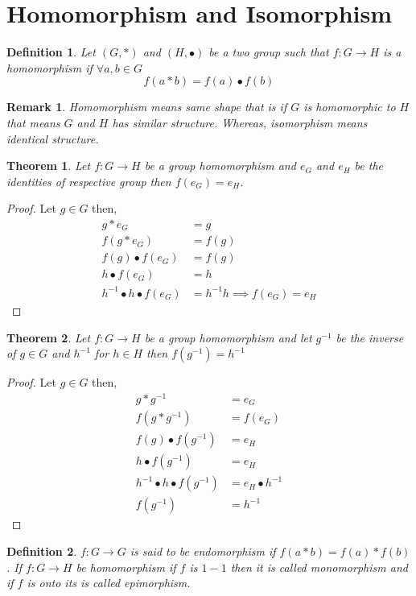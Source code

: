 \documentclass[12pt,a4paper]{article}
\newtheorem{thm}{Theorem}
\newtheorem*{defn}{Definition}
\newtheorem*{rem}{Remark}
\begin{document}
\section{Homomorphism and Isomorphism}
\begin{defn} \normalfont
	Let $(G,*)$ and $(H,\bullet)$ be a two group such that $f: G \to H$ is a homomorphism if $\forall a,b \in G$ 
	$$
		f(a*b) = f(a) \bullet f(b)
	$$
\end{defn}
\begin{rem}
	Homomorphism means same shape that is if $G$ is homomorphic to $H$ that means $G$ and $H$ has similar structure. Whereas, isomorphism means identical structure.
\end{rem}

\begin{thm}
	Let $f: G \to H$ be a group homomorphism and $e_{G}$ and $e_{H}$ be the identities of respective group then $f(e_{G}) = e_{H}$.
\end{thm}
\begin{proof}
	Let $g \in G$ then,
	\begin{align*}
		g*e_{G} &= g \\
		f(g*e_{G}) &= f(g) \\
		f(g)\bullet f(e_{G}) &= f(g) \\
		h \bullet f(e_{G}) &= h \\
		h^{-1} \bullet h \bullet f(e_{G}) &= h^{-1}h \implies f(e_{G}) = e_{H}
	\end{align*}
\end{proof}


\begin{thm}
	Let $f: G \to H$ be a group homomorphism and let $g^{-1}$ be the inverse of $g \in G$ and $h^{-1}$ for $h \in H$ then $f(g^{-1}) = h^{-1}$
\end{thm}
\begin{proof}
	Let $g \in G$ then, 
	\begin{align*}
		g*g^{-1} & = e_{G} \\
		f(g*g^{-1}) & = f(e_{G}) \\
		f(g)\bullet f(g^{-1}) & = e_{H} \\
		h\bullet f(g^{-1}) & = e_{H} \\
		h^{-1}\bullet h\bullet f(g^{-1}) & = e_{H} \bullet h^{-1} \\
		f(g^{-1}) & =  h^{-1}
	\end{align*}
\end{proof}
\begin{defn}
	\normalfont $f: G \to G$ is said to be \textit{endomorphism} if $f(a*b)=f(a)*f(b)$. If $f:G \to H$ be homomorphism if $f$ is $1-1$ then it is called \textit{monomorphism} and if $f$ is onto its is called \textit{epimorphism.}
\end{defn}
\end{document}

